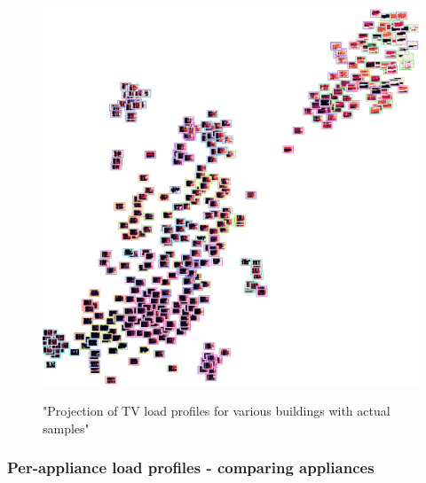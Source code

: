 \begin{figure}[H]
	\centering
	\caption{"Projection of TV load profiles for various buildings with actual samples"}
	\includegraphics[width=.9\textwidth]{Figures/TSNE/TSNE_per_appliance/all/img_scatter_alltelevision.png}
	\label{fig:tsne_pa_img_scatter_all_tv}
\end{figure}

\subsubsection{Per-appliance load profiles - comparing appliances}

